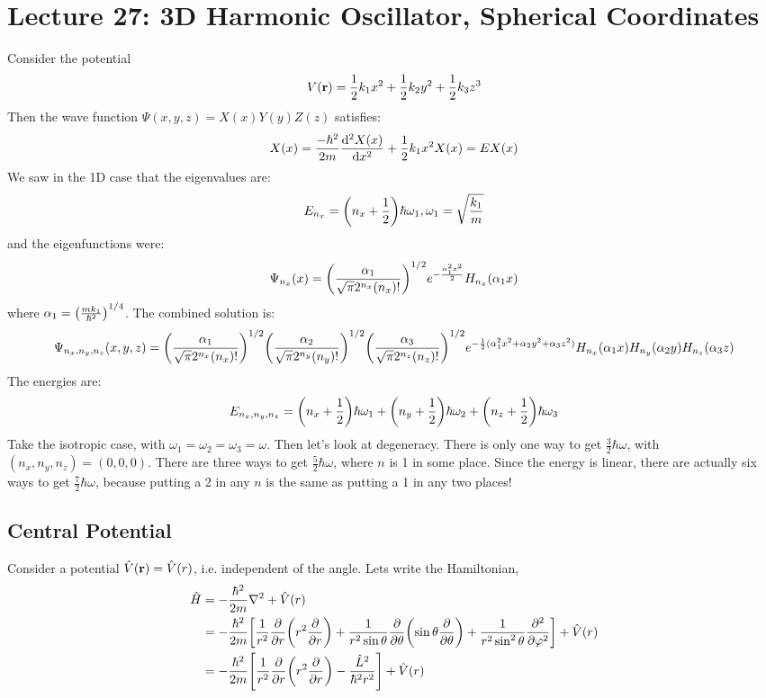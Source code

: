 \section{Lecture 27: 3D Harmonic Oscillator, Spherical Coordinates}

Consider the potential
\[ V(\mathbf{r}) = \frac{1}{2} k_1 x^2 + \frac{1}{2} k_2 y^2 + \frac{1}{2} k_3 z^3 \]
Then the wave function $\Psi(x, y, z) = X(x) Y(y) Z(z)$ satisfies:
\[ X(x) = \frac{-\hbar^2}{2m} \dv{^2 X(x)}{x^2} + \frac{1}{2} k_1 x^2 X(x) = EX(x) \]
We saw in the 1D case that the eigenvalues are:
\[ E_{n_x} = \qty(n_x + \frac{1}{2}) \hbar \omega_1, \omega_1 = \sqrt{\frac{k_1}{m}} \]
and the eigenfunctions were:
\[ \Psi_{n_x}(x) = \qty(\frac{\alpha_1}{\sqrt{\pi} 2^{n_x} (n_x)!})^{1/2} e^{-\frac{\alpha_1^2 x^2}{2}} H_{n_x}(\alpha_1 x)\]
where $\alpha_1 = \qty(\frac{mk_1}{\hbar^2})^{1/4}$. The combined solution is:
\[ \Psi_{n_x, n_y, n_z}(x, y, z) =  \qty(\frac{\alpha_1}{\sqrt{\pi} 2^{n_x} (n_x)!})^{1/2} \qty(\frac{\alpha_2}{\sqrt{\pi} 2^{n_y} (n_y)!})^{1/2} \qty(\frac{\alpha_3}{\sqrt{\pi} 2^{n_z} (n_z)!})^{1/2} e^{-\frac{1}{2}(\alpha_1^2 x^2 + \alpha_2 y^2 + \alpha_3 z^2)} H_{n_x}(\alpha_1 x) H_{n_y}(\alpha_2 y) H_{n_z}(\alpha_3 z) \]
The energies are:
\[ E_{n_x, n_y, n_z} = \qty(n_x + \frac{1}{2}) \hbar \omega_1 + \qty(n_y + \frac{1}{2}) \hbar \omega_2 + \qty(n_z + \frac{1}{2}) \hbar \omega_3  \]
Take the isotropic case, with $\omega_1 = \omega_2 = \omega_3 = \omega$. Then let's look at degeneracy. There is only one way to get $\frac{3}{2} \hbar \omega$,
with $(n_x, n_y, n_z) = (0, 0, 0)$. There are three ways to get $\frac{5}{2} \hbar \omega$, where $n$ is 1 in some place. Since the energy is linear,
there are actually six ways to get $\frac{7}{2} \hbar \omega$, because putting a 2 in any $n$ is the same as putting a 1 in any two places!

\subsection{Central Potential}
Consider a potential $\hat{V}(\mathbf{r}) = \hat{V}(r)$, i.e. independent of the angle. Lets write the Hamiltonian,
\begin{align*}
    \hat{H} &= - \frac{\hbar^2}{2m} \nabla^2 + \hat{V}(r) \\
    &= -\frac{\hbar^2}{2m} \qty[\frac{1}{r^2} \pdv{}{r}\qty(r^2 \pdv{}{r}) + \frac{1}{r^2 \sin\theta} \pdv{}{\theta}\qty(\sin \theta \pdv{}{\theta}) + \frac{1}{r^2 \sin^2 \theta} \pdv{^2}{\varphi^2}] + \hat{V}(r) \\
    &= -\frac{\hbar^2}{2m} \qty[\frac{1}{r^2} \pdv{}{r}\qty(r^2 \pdv{}{r}) - \frac{\hat{L}^2}{\hbar^2 r^2}] + \hat{V}(r)
\end{align*}

